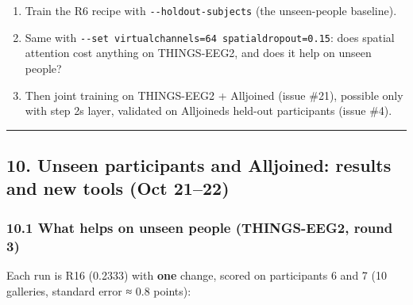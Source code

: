 \documentclass[
  11pt,
]{article}
\providecommand{\tightlist}{%
  \setlength{\itemsep}{0pt}\setlength{\parskip}{0pt}}
\renewcommand{\_}{\oldunderscore\allowbreak}
\begin{document}
\begin{enumerate}
\def\labelenumi{\arabic{enumi}.}
\tightlist
\item
  Train the R6 recipe with
  \texttt{-\/-holdout-subjects} (the
  unseen-people baseline).
\item
  Same with
  \texttt{-\/-set\ virtual\_channels=64\ spatial\_dropout=0.15}:
  does spatial attention cost anything
  on THINGS-EEG2, and does it help on
  unseen people?
\item
  Then joint training on THINGS-EEG2 +
  Alljoined (issue \#21), possible only
  with step 2\textquotesingle s layer,
  validated on
  Alljoined\textquotesingle s held-out
  participants (issue \#4).
\end{enumerate}

\begin{center}\rule{0.5\linewidth}{0.5pt}\end{center}

\subsection{10. Unseen participants and
Alljoined: results and new tools (Oct
21--22)}\label{unseen-participants-and-alljoined-results-and-new-tools-oct-2122}

\subsubsection{10.1 What helps on unseen
people (THINGS-EEG2, round
3)}\label{what-helps-on-unseen-people-things-eeg2-round-3}

Each run is R16 (0.2333) with
\textbf{one} change, scored on
participants 6 and 7 (10 galleries,
standard error ≈ 0.8 points):
\end{document}
